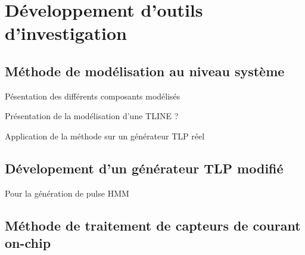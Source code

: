 \chapter{Développement d'outils d'investigation}
\label{chap:2}
\section{Méthode de modélisation au niveau système}

Pésentation des différents composants modélisés

Présentation de la modélisation d'une TLINE ?

Application de la méthode sur un générateur TLP réel

\section{Dévelopement d'un générateur TLP modifié}

Pour la génération de pulse HMM

\section{Méthode de traitement de capteurs de courant on-chip}
